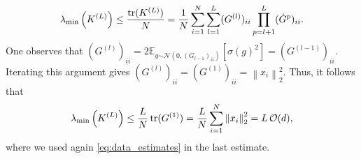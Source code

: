\documentclass[11pt]{article}
\def\diag{\operatorname{\mathop{diag}}}
\newcommand{\E}{\mathbb{E}}
\newcommand{\distas}[1]{\mathbin{\overset{#1}{\sim}}}
\newcommand{\norm}[1]{\left\|#1\right\|}
\newcommand{\evmin}[1]{\lambda_{\rm min}\left(#1\right)}
\def\tr{\mathop{\rm tr}\nolimits}
\def\max{\mathop{\rm max}\nolimits}
\def\ones{\mathbf{1}}
\begin{document}
    \begin{align*}
	\evmin{K^{(L)}} 
	\leq \frac{\tr(K^{(L)})}{N}
	=\frac{1}{N}\sum_{i=1}^{N}\sum_{l=1}^{L} (G^{(l)})_{ii} \prod_{p=l+1}^{L} (\dot{G}^p)_{ii} .
    \end{align*}
    One observes that $(G^{(l)})_{ii}=2\E_{g\distas{}\mathcal{N}(0,(G_{l-1})_{ii})} [\sigma(g)^2]=(G^{(l-1)})_{ii}.$
    Iterating this argument gives $(G^{(l)})_{ii}=(G^{(1)})_{ii}=\norm{x_i}_2^2.$
    Thus, it follows that
    \begin{align*}
	\evmin{K^{(L)}} 
	\leq \frac{L}{N}\tr(G^{(1)})
	= \frac{L}{N}\sum_{i=1}^{N} \norm{x_i}_2^2 = L\,\mathcal{O}(d),
    \end{align*}
    where we used again \eqref{eq:data_estimates} in the last estimate.

\end{document}
